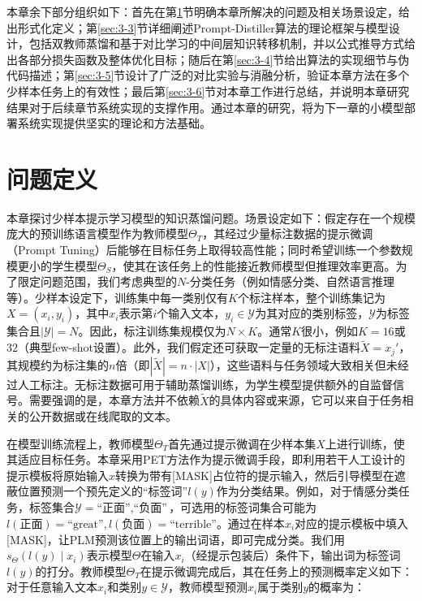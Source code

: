 \documentclass[../main.tex]{subfiles}
\begin{document}
本章余下部分组织如下：首先在第\ref{sec:3-2}节明确本章所解决的问题及相关场景设定，给出形式化定义；第\ref{sec:3-3}节详细阐述Prompt-Distiller算法的理论框架与模型设计，包括双教师蒸馏和基于对比学习的中间层知识转移机制，并以公式推导方式给出各部分损失函数及整体优化目标；随后在第\ref{sec:3-4}节给出算法的实现细节与伪代码描述；第\ref{sec:3-5}节设计了广泛的对比实验与消融分析，验证本章方法在多个少样本任务上的有效性；最后第\ref{sec:3-6}节对本章工作进行总结，并说明本章研究结果对于后续章节系统实现的支撑作用。通过本章的研究，将为下一章的小模型部署系统实现提供坚实的理论和方法基础。

\section{问题定义}
\label{sec:3-2}
本章探讨少样本提示学习模型的知识蒸馏问题。场景设定如下：假定存在一个规模庞大的预训练语言模型作为教师模型$\Theta_T$，其经过少量标注数据的提示微调（Prompt Tuning）后能够在目标任务上取得较高性能；同时希望训练一个参数规模更小的学生模型$\Theta_S$，使其在该任务上的性能接近教师模型但推理效率更高。为了限定问题范围，我们考虑典型的$N$-分类任务（例如情感分类、自然语言推理等）。少样本设定下，训练集中每一类别仅有$K$个标注样本，整个训练集记为$X={(x_i, y_i)}$，其中$x_i$表示第$i$个输入文本，$y_i \in \mathcal{Y}$为其对应的类别标签，$\mathcal{Y}$为标签集合且$|\mathcal{Y}| = N$。因此，标注训练集规模仅为$N \times K$。通常$K$很小，例如$K=16$或$32$（典型few-shot设置）。此外，我们假定还可获取一定量的无标注语料$\tilde{X}={x_j'}$，其规模约为标注集的$n$倍（即$|\tilde{X}| = n\cdot |X|$），这些语料与任务领域大致相关但未经过人工标注。无标注数据可用于辅助蒸馏训练，为学生模型提供额外的自监督信号。需要强调的是，本章方法并不依赖$\tilde{X}$的具体内容或来源，它可以来自于任务相关的公开数据或在线爬取的文本。

在模型训练流程上，教师模型$\Theta_T$首先通过提示微调在少样本集$X$上进行训练，使其适应目标任务。本章采用PET方法作为提示微调手段，即利用若干人工设计的提示模板将原始输入$x$转换为带有[MASK]占位符的提示输入，然后引导模型在遮蔽位置预测一个预先定义的“标签词”$l(y)$作为分类结果。例如，对于情感分类任务，标签集合$\mathcal{Y}={\text{“正面”}, \text{“负面”}}$，可选用的标签词集合可能为 ${l(\text{正面})=\text{“great”}, l(\text{负面})=\text{“terrible”}}$。通过在样本$x_i$对应的提示模板中填入[MASK]，让PLM预测该位置上的输出词语，即可完成分类。我们用$s_{\Theta}(l(y)\mid x_i)$表示模型$\Theta$在输入$x_i$（经提示包装后）条件下，输出词为标签词$l(y)$的打分。教师模型$\Theta_T$在提示微调完成后，其在任务上的预测概率定义如下：对于任意输入文本$x_i$和类别$y\in\mathcal{Y}$，教师模型预测$x_i$属于类别$y$的概率为：
\end{document}
